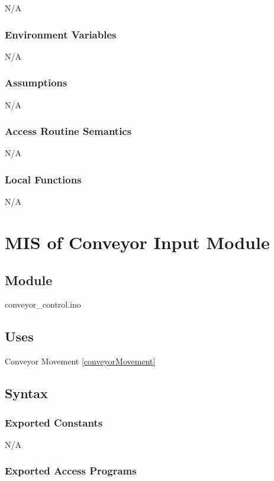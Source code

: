 \documentclass[12pt, titlepage]{article}
\begin{document}
N/A

\subsubsection{Environment Variables}

N/A

\subsubsection{Assumptions}

N/A

\subsubsection{Access Routine Semantics}

N/A

\subsubsection{Local Functions}

N/A

  \section{MIS of Conveyor Input Module} \label{conveyorInput} 



\subsection{Module}

conveyor\_control.ino


\subsection{Uses}
Conveyor Movement \ref{conveyorMovement}

\subsection{Syntax}
\subsubsection{Exported Constants}
N/A
\subsubsection{Exported Access Programs}
\end{document}
